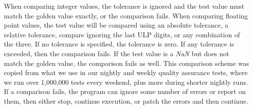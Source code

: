 When comparing integer values, the tolerance is ignored and the test value must match the golden value exactly, or the comparison fails.
When comparing floating point values, the test value will be compared using an absolute tolerance, a relative tolerance, compare ignoring the last ULP digits, or any combination of the three.
If no tolerance is specified, the tolerance is zero.
If any tolerance is exceeded, then the comparison fails.
If the test value is a \emph{NaN} but does not match the golden value, the comparison fails as well.
This comparison scheme was copied from what we use in our nightly and weekly quality assurance tests, where we run over 1,000,000 tests every weekend, plus more during shorter nightly runs.
If a comparison fails, the program can ignore some number of errors or report on them, then either stop, continue execution, or patch the errors and then continue.
